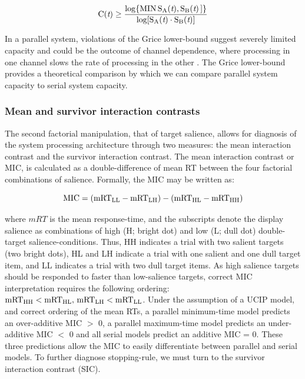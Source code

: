 
\begin{equation}
	\rm C({\rm \textit{t}}) \geq \frac{\log\{ MIN\, S_A({\rm \textit{t}}), S_B({\rm \textit{t}})\,]\} }{ log[ S_A({\rm \textit{t}}) \cdot S_B({\rm \textit{t}}) ] }
    \label{eq:girce}
\end{equation}

\noindent
In a parallel system, violations of the Grice lower-bound suggest severely limited capacity and could be the outcome of channel dependence, where processing in one channel slows the rate of processing in the other \cite{eidels2011}. The Grice lower-bound provides a theoretical comparison by which we can compare parallel system capacity to serial system capacity. 

\subsubsection{Mean and survivor interaction contrasts}
The second factorial manipulation, that of target salience, allows for diagnosis of the system processing architecture through two measures: the mean interaction contrast and the survivor interaction contrast. The mean interaction contrast or MIC, is calculated as a double-difference of mean RT between the four factorial combinations of salience. Formally, the MIC may be written as:

\begin{equation}
	\rm MIC = \left( mRT_{LL} - mRT_{LH} \right) - \left( mRT_{HL} - mRT_{HH} \right)
    \label{eq:mic}
\end{equation}

\noindent
where $mRT$ is the mean response-time, and the subscripts denote the display salience as combinations of high (H; \ie bright dot) and low (L; \ie dull dot) double-target salience-conditions. Thus, HH indicates a trial with two salient targets (\eg two bright dots), HL and LH indicate a trial with one salient and one dull target item, and LL indicates a trial with two dull target items. As high salience targets should be responded to faster than low-salience targets, correct MIC interpretation requires the following ordering: $\rm{mRT}_{\rm HH} < mRT_{\rm HL},\, mRT_{\rm LH} < mRT_{\rm LL}$. Under the assumption of a UCIP model, and correct ordering of the mean RTs, a parallel minimum-time model predicts an over-additive MIC $>$ 0, a parallel maximum-time model predicts an under-additive MIC $<$ 0 and all serial models predict an additive MIC = 0. These three predictions allow the MIC to easily differentiate between parallel and serial models. To further diagnose stopping-rule, we must turn to the survivor interaction contrast (SIC).

